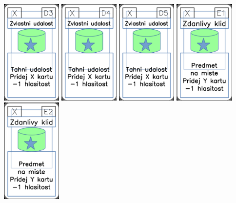 \documentclass[a4paper]{article}
\begin{document}
	\includegraphics[width=3.0cm]{img-5_17}
	\includegraphics[width=3.0cm]{img-5_18}
	\includegraphics[width=3.0cm]{img-5_19}
	\includegraphics[width=3.0cm]{img-5_20}
	\includegraphics[width=3.0cm]{img-5_21}
\end{document}
